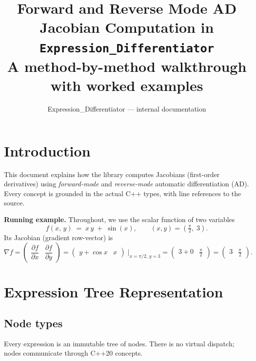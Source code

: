 \documentclass[11pt,a4paper]{article}
\title{%
  \textbf{Forward and Reverse Mode AD}\\[4pt]
  \large Jacobian Computation in \texttt{Expression\_Differentiator}\\[2pt]
  \normalsize A method-by-method walkthrough with worked examples
}
\author{Expression\_Differentiator --- internal documentation}
\date{}
\newcommand{\pf}[2]{\dfrac{\partial #1}{\partial #2}}
\begin{document}
\maketitle
\tableofcontents
\bigskip

\section{Introduction}

This document explains how the library computes Jacobians (first-order
derivatives) using \emph{forward-mode} and \emph{reverse-mode} automatic
differentiation (AD).  Every concept is grounded in the actual C++ types, with
line references to the source.

\medskip
\noindent\textbf{Running example.}  Throughout, we use the scalar function of
two variables
\[
  f(x,\,y) \;=\; x\,y \;+\; \sin(x),
  \qquad (x,y) = \left(\tfrac{\pi}{2},\;3\right).
\]
Its Jacobian (gradient row-vector) is
\[
  \nabla f = \begin{pmatrix} \pf{f}{x} & \pf{f}{y} \end{pmatrix}
           = \begin{pmatrix} y + \cos x & x \end{pmatrix}
  \;\Big|_{x=\pi/2,\,y=3}
  = \begin{pmatrix} 3 + 0 & \tfrac{\pi}{2} \end{pmatrix}
  = \begin{pmatrix} 3 & \tfrac{\pi}{2} \end{pmatrix}.
\]

\section{Expression Tree Representation}

\subsection{Node types}

Every expression is an immutable tree of nodes.  There is no virtual dispatch;
nodes communicate through C++20 concepts.
\end{document}
